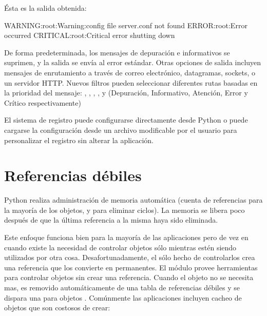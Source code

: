 \documentclass[a5paper,10pt,spanish]{sphinxmanual}
\begin{document}
\sphinxAtStartPar
Ésta es la salida obtenida:

\begin{sphinxVerbatim}[commandchars=\\\{\}]
WARNING:root:Warning:config file server.conf not found
ERROR:root:Error occurred
CRITICAL:root:Critical error \PYGZhy{}\PYGZhy{} shutting down
\end{sphinxVerbatim}

\sphinxAtStartPar
De forma predeterminada, los mensajes de depuración e informativos se suprimen, y la salida se envía al error estándar.  Otras opciones de salida incluyen mensajes de enrutamiento a través de correo electrónico, datagramas, sockets, o un servidor HTTP.  Nuevos filtros pueden seleccionar diferentes rutas basadas en la prioridad del mensaje: , , , , y  (Depuración, Informativo, Atención, Error y Crítico respectivamente)

\sphinxAtStartPar
El sistema de registro puede configurarse directamente desde Python o puede cargarse la configuración desde un archivo modificable por el usuario para personalizar el registro sin alterar la aplicación.


\section{Referencias débiles}
\label{\detokenize{tutorial/stdlib2:weak-references}}\label{\detokenize{tutorial/stdlib2:tut-weak-references}}
\sphinxAtStartPar
Python realiza administración de memoria automática (cuenta de referencias para la mayoría de los objetos, y {\hyperref[\detokenize{glossary:term-garbage-collection}]{}} para eliminar ciclos).  La memoria se libera poco después de que la última referencia a la misma haya sido eliminada.

\sphinxAtStartPar
Este enfoque funciona bien para la mayoría de las aplicaciones pero de vez en cuando existe la necesidad de controlar objetos sólo mientras estén siendo utilizados por otra cosa. Desafortunadamente, el sólo hecho de controlarlos crea una referencia que los convierte en permanentes. El módulo  provee herramientas para controlar objetos sin crear una referencia. Cuando el objeto no se necesita mas, es removido automáticamente de una tabla de referencias débiles y se dispara una  para objetos . Comúnmente las aplicaciones incluyen cacheo de objetos que son costosos de crear:
\end{document}
